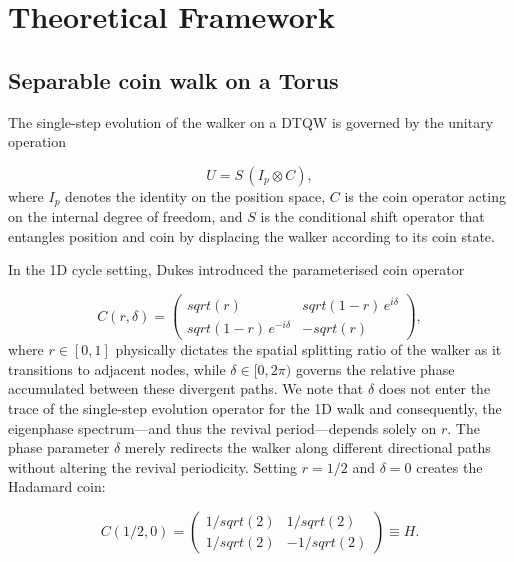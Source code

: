 \documentclass[aps,pra,reprint,amsmath,amssymb,superscriptaddress,floatfix]{revtex4-2}
\def\frac#1#2{#1/#2}%
\def\rho{r}%
\def\sqrt#1{sqrt(#1)}%
\begin{document}
\section{\label{sec:theory}Theoretical Framework}\subsection{Separable coin walk on a Torus}\par
The single-step evolution of the walker on a DTQW is governed by the 
unitary operation
\par
\begin{equation}
U = S \, (I_p \otimes C),
\label{eq:general_evolution}
\end{equation}
where \(I_p\) denotes the identity on the position space, \(C\) is the
coin operator acting on the internal degree of freedom, and \(S\) is
the conditional shift operator that entangles position and coin by
displacing the walker according to its coin state.
\par
In the 1D cycle setting, Dukes \cite{Dukes2014} introduced the
parameterised coin operator
\par
\begin{equation}
C(\rho, \delta) =
\begin{pmatrix}
\sqrt{\rho} & \sqrt{1-\rho}\, e^{i\delta} \\[4pt]
\sqrt{1-\rho}\, e^{-i\delta} & -\sqrt{\rho}
\end{pmatrix},
\label{eq:1d_coin}
\end{equation}
where \(\rho \in [0, 1]\) physically dictates the spatial splitting
ratio of the walker as it transitions to adjacent nodes, while
\(\delta \in [0, 2\pi)\) governs the relative phase accumulated between
these divergent paths. We note that 
\(\delta\) does not enter the trace of the single-step evolution
operator for the 1D walk and consequently, the eigenphase
spectrum---and thus the revival period---depends solely on \(\rho\).
The phase parameter \(\delta\) merely redirects the walker along
different directional paths without altering the revival periodicity.
Setting \(\rho = \frac{1}{2}\) and \(\delta = 0\)
creates the Hadamard coin:
\par
\begin{equation}
C\left(\frac{1}{2}, 0\right) =
\begin{pmatrix}
\frac{1}{\sqrt{2}} & \frac{1}{\sqrt{2}} \\[4pt]
\frac{1}{\sqrt{2}} & -\frac{1}{\sqrt{2}}
\end{pmatrix} \equiv H.
\label{eq:hadamard_coin}
\end{equation}
\end{document}

